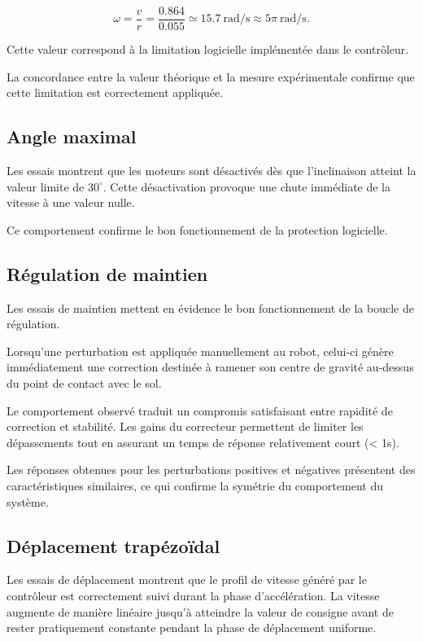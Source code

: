 \[
\omega=\frac{v}{r}
=\frac{0.864}{0.055}
\simeq15.7~\si{\radian\per\second}
\approx5\pi~\si{\radian\per\second}.
\]

Cette valeur correspond à la limitation logicielle implémentée dans le contrôleur.

La concordance entre la valeur théorique et la mesure expérimentale confirme que cette limitation est correctement appliquée.

\subsection{Angle maximal}

Les essais montrent que les moteurs sont désactivés dès que l'inclinaison atteint la valeur limite de $30^\circ$. Cette désactivation provoque une chute immédiate de la vitesse à une valeur nulle.

Ce comportement confirme le bon fonctionnement de la protection logicielle. 

\subsection{Régulation de maintien}

Les essais de maintien mettent en évidence le bon fonctionnement de la boucle de régulation.

Lorsqu'une perturbation est appliquée manuellement au robot, celui-ci génère immédiatement une correction destinée à ramener son centre de gravité au-dessus du point de contact avec le sol.

Le comportement observé traduit un compromis satisfaisant entre rapidité de correction et stabilité. Les gains du correcteur permettent de limiter les dépassements tout en assurant un temps de réponse relativement court (< 1s).

Les réponses obtenues pour les perturbations positives et négatives présentent des caractéristiques similaires, ce qui confirme la symétrie du comportement du système.

\subsection{Déplacement trapézoïdal}

Les essais de déplacement montrent que le profil de vitesse généré par le contrôleur est correctement suivi durant la phase d'accélération. La vitesse augmente de manière linéaire jusqu'à atteindre la valeur de consigne avant de rester pratiquement constante pendant la phase de déplacement uniforme.

